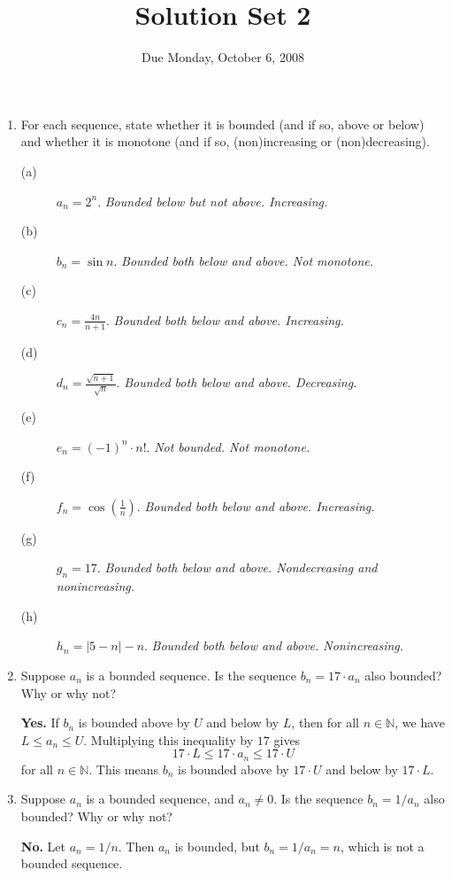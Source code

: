 \documentclass[12pt]{article}
\title{Solution Set 2}
\date{Due Monday, October 6, 2008}
\newcommand{\N}{\mathbb{N}}
\begin{document}
\maketitle

\begin{enumerate}
\item For each sequence, state whether it is bounded (and if so, above or below) and whether it is monotone (and if so, (non)increasing or (non)decreasing).

\begin{description}
\item[(a)] $a_n = 2^n$.  \textit{Bounded below but not above.  Increasing.}
\vfill
\item[(b)] $b_n = \sin n$.  \textit{Bounded both below and above.  Not monotone.}
\vfill
\item[(c)] $c_n = \displaystyle\frac{4 n}{n+1}$.  \textit{Bounded both below and above.  Increasing.}
\vfill
\item[(d)] $d_n = \displaystyle\frac{\sqrt{n+1}}{\sqrt{n}}$.  \textit{Bounded both below and above.  Decreasing.}
\vfill
\item[(e)] $e_n = (-1)^n \cdot n!$.  \textit{Not bounded.  Not monotone.}
\vfill
\item[(f)] $f_n = \cos \displaystyle\left(\frac{1}{n}\right)$.  \textit{Bounded both below and above.  Increasing.}
\vfill
\item[(g)] $g_n = 17$.  \textit{Bounded both below and above.  Nondecreasing and nonincreasing.}
\vfill
\item[(h)] $h_n = \left|5 - n\right| - n$.  \textit{Bounded both below and above.  Nonincreasing.}
\vfill
\end{description}

\item Suppose $a_n$ is a bounded sequence.  Is the sequence $b_n = 17 \cdot a_n$ also bounded?  Why or why not?  
\vfill

\textbf{Yes.}  If $b_n$ is bounded above by $U$ and below by $L$, then for all $n \in \N$, we have $L \leq a_n \leq U$.  Multiplying this inequality by $17$ gives
$$
17 \cdot L \leq 17 \cdot a_n \leq 17 \cdot U
$$
for all $n \in \N$.  This means $b_n$ is bounded above by $17 \cdot U$
and below by $17 \cdot L$.
\vfill

\item Suppose $a_n$ is a bounded sequence, and $a_n \neq 0$.  Is the sequence $b_n = 1/a_n$ also bounded?  Why or why not?
\vfill

\textbf{No.}  Let $a_n = 1/n$.  Then $a_n$ is bounded, but $b_n = 1/a_n = n$, which is not a bounded sequence.
\vfill


\end{enumerate}
\end{document}

